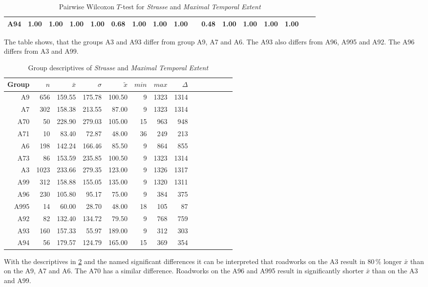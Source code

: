 \begin{table}[ht!]
\begin{tabular}{rrrrrrrrrrrrrrrrr}
		A94  & 1.00 & 1.00 & 1.00 & 1.00 & 0.68 & 1.00 & 1.00 & 1.00 & \red{0.01} & 0.48 & 1.00 & 1.00 & 1.00 & 1.00 &  &  \\ 
		\bottomrule
	\end{tabular}
	\caption{Pairwise Wilcoxon $T$-test for \textit{Strasse} and \textit{Maximal Temporal Extent}}
	\label{tbl:wilcoxon_arbis_matched_Strasse_TMax}
\end{table}
The table shows, that the groups A3 and A93 differ from group A9, A7 and A6. The A93 also differs from A96, A995 and A92. The A96 differs from A3 and A99.
\begin{table}[ht!]
	\tiny
	\centering
	\begin{tabular}{rrrrrrrrrrrrrr}
		\toprule
		Group & $n$ & $\bar{x}$ & $\sigma$ & $\tilde{x}$ & $min$ & $max$ & $\Delta$ \\
		\midrule
		A9   & 656  & 159.55 & 175.78 & 100.50 & 9   & 1323 & 1314 \\ 
		A7   & 302  & 158.38 & 213.55 & 87.00  & 9   & 1323 & 1314 \\ 
		A70  & 50   & 228.90 & 279.03 & 105.00 & 15  & 963  & 948 \\ 
		A71  & 10   & 83.40  & 72.87  & 48.00  & 36  & 249  & 213 \\ 
		A6   & 198  & 142.24 & 166.46 & 85.50  & 9   & 864  & 855 \\ 
		A73  & 86   & 153.59 & 235.85 & 100.50 & 9   & 1323 & 1314 \\ 
		A3   & 1023 & 233.66 & 279.35 & 123.00 & 9   & 1326 & 1317 \\ 
		A99  & 312  & 158.88 & 155.05 & 135.00 & 9   & 1320 & 1311 \\ 
		A96  & 230  & 105.80 & 95.17  & 75.00  & 9   & 384  & 375 \\ 
		A995 & 14   & 60.00  & 28.70  & 48.00  & 18  & 105  & 87 \\ 
		A92  & 82   & 132.40 & 134.72 & 79.50  & 9   & 768  & 759 \\ 
		A93  & 160  & 157.33 & 55.97  & 189.00 & 9   & 312  & 303 \\  
		A94  & 56   & 179.57 & 124.79 & 165.00 & 15  & 369  & 354 \\ 
		\bottomrule
	\end{tabular}
	\caption{Group descriptives of \textit{Strasse} and \textit{Maximal Temporal Extent}}
	\label{tbl:descriptives_arbis_matched_Strasse_TMax}
\end{table}
With the descriptives in \cref{tbl:descriptives_arbis_matched_Strasse_TMax} and the named significant differences it can be interpreted that roadworks on the A3 result in 80\,\% longer $\bar{x}$ than on the A9, A7 and A6. The A70 has a similar difference. Roadworks on the A96 and A995 result in significantly shorter $\bar{x}$ than on the A3 and A99.

